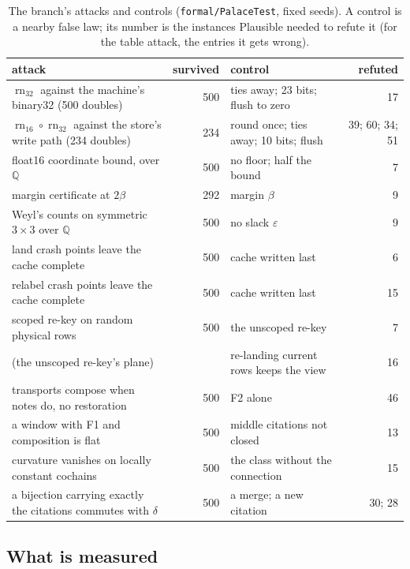 \documentclass[11pt]{article}
\theoremstyle{plain}
\theoremstyle{definition}
\theoremstyle{remark}
\newcommand{\rn}{\operatorname{rn}}
\begin{document}
\begin{table}[htbp]
\centering\footnotesize
\caption{The branch's attacks and controls (\texttt{formal/PalaceTest}, fixed seeds). A control
is a nearby false law; its number is the instances Plausible needed to refute it (for the table
attack, the entries it gets wrong).}\label{tab:attacks}
\setlength{\tabcolsep}{4pt}
\begin{tabular}{p{}rp{}r}
\toprule
attack & survived & control & refuted \\
\midrule
$\rn_{32}$ against the machine's binary32 (500 doubles) & 500 & ties away; 23 bits; flush to zero & 17 \\
$\rn_{16}\circ\rn_{32}$ against the store's write path (234 doubles) & 234 & round once; ties away; 10 bits; flush & 39; 60; 34; 51 \\
float16 coordinate bound, over $\mathbb{Q}$ & 500 & no floor; half the bound & 7 \\
margin certificate at $2\beta$ & 292 & margin $\beta$ & 9 \\
Weyl's counts on symmetric $3\times 3$ over $\mathbb{Q}$ & 500 & no slack $\varepsilon$ & 9 \\
land crash points leave the cache complete & 500 & cache written last & 6 \\
relabel crash points leave the cache complete & 500 & cache written last & 15 \\
scoped re-key on random physical rows & 500 & the unscoped re-key & 7 \\
(the unscoped re-key's plane) & & re-landing current rows keeps the view & 16 \\
transports compose when notes do, no restoration & 500 & F2 alone & 46 \\
a window with F1 and composition is flat & 500 & middle citations not closed & 13 \\
curvature vanishes on locally constant cochains & 500 & the class without the connection & 15 \\
a bijection carrying exactly the citations commutes with $\delta$ & 500 & a merge; a new citation & 30; 28 \\
\bottomrule
\end{tabular}
\end{table}

\subsection{What is measured}
\end{document}
